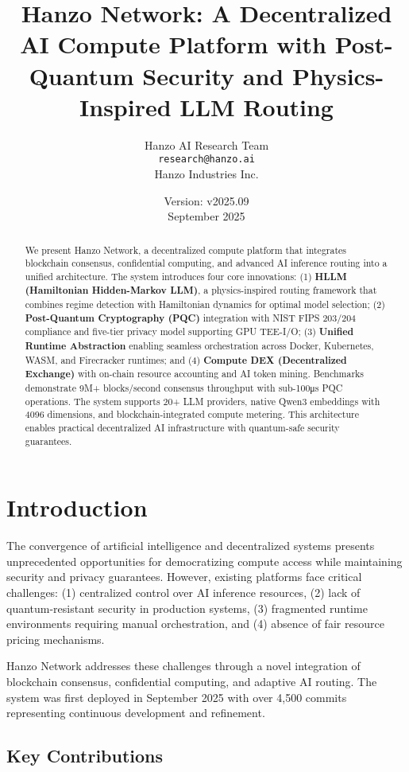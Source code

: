 \documentclass[11pt,twocolumn]{article}
\title{\textbf{Hanzo Network: A Decentralized AI Compute Platform with Post-Quantum Security and Physics-Inspired LLM Routing}}
\author{
Hanzo AI Research Team \\
\texttt{research@hanzo.ai} \\
Hanzo Industries Inc.
}
\date{Version: v2025.09 \\ September 2025}
\begin{document}
\maketitle

\begin{abstract}
We present Hanzo Network, a decentralized compute platform that integrates blockchain consensus, confidential computing, and advanced AI inference routing into a unified architecture. The system introduces four core innovations: (1) \textbf{HLLM (Hamiltonian Hidden-Markov LLM)}, a physics-inspired routing framework that combines regime detection with Hamiltonian dynamics for optimal model selection; (2) \textbf{Post-Quantum Cryptography (PQC)} integration with NIST FIPS 203/204 compliance and five-tier privacy model supporting GPU TEE-I/O; (3) \textbf{Unified Runtime Abstraction} enabling seamless orchestration across Docker, Kubernetes, WASM, and Firecracker runtimes; and (4) \textbf{Compute DEX (Decentralized Exchange)} with on-chain resource accounting and AI token mining. Benchmarks demonstrate 9M+ blocks/second consensus throughput with sub-100μs PQC operations. The system supports 20+ LLM providers, native Qwen3 embeddings with 4096 dimensions, and blockchain-integrated compute metering. This architecture enables practical decentralized AI infrastructure with quantum-safe security guarantees.
\end{abstract}

\section{Introduction}

The convergence of artificial intelligence and decentralized systems presents unprecedented opportunities for democratizing compute access while maintaining security and privacy guarantees. However, existing platforms face critical challenges: (1) centralized control over AI inference resources, (2) lack of quantum-resistant security in production systems, (3) fragmented runtime environments requiring manual orchestration, and (4) absence of fair resource pricing mechanisms.

Hanzo Network addresses these challenges through a novel integration of blockchain consensus, confidential computing, and adaptive AI routing. The system was first deployed in September 2025 with over 4,500 commits representing continuous development and refinement.

\subsection{Key Contributions}
\end{document}
